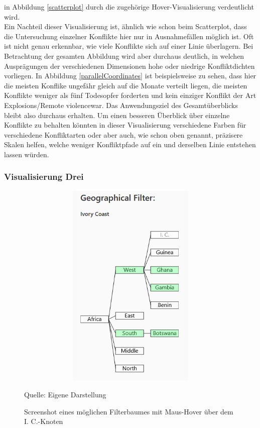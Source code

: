 \documentclass[usegeometry=true]{scrartcl}
\begin{document}
in Abbildung \ref{scatterplot} durch die zugehörige Hover-Visualisierung verdeutlicht wird.\\ Ein Nachteil dieser Visualisierung ist, ähnlich wie schon beim Scatterplot, dass die Untersuchung einzelner Konflikte hier nur in Ausnahmefällen möglich ist. Oft ist nicht genau erkennbar, wie viele Konflikte sich auf einer Linie überlagern. Bei Betrachtung der gesamten Abbildung wird aber durchaus deutlich, in welchen Ausprägungen der verschiedenen Dimensionen hohe oder niedrige Konfliktdichten vorliegen. In Abbildung \ref{parallelCoordinates} ist beispielsweise zu sehen, dass hier die meisten Konflike ungefähr gleich auf die Monate verteilt liegen, die meisten Konflikte weniger als fünf Todesopfer forderten und kein einziger Konflikt der Art \glqq Explosions/Remote violence\grqq war. Das Anwendungsziel des Gesamtüberblicks bleibt also durchaus erhalten. Um einen besseren Überblick über einzelne Konflikte zu behalten könnten in dieser Visualisierung verschiedene Farben für verschiedene Konfliktarten oder aber auch, wie schon oben genannt, präzisere Skalen helfen, welche weniger Konfliktpfade auf ein und derselben Linie entstehen lassen würden.\\

\subsubsection{Visualisierung Drei}

\begin{figure}[]
\begin{center}
\includegraphics[width=12cm,height=10cm,keepaspectratio]{FilterTree.PNG}%
\caption{Screenshot eines möglichen Filterbaumes mit Maus-Hover über dem \glqq I. C.\grqq-Knoten}
Quelle: Eigene Darstellung
\label{filtertree}
\end{center}
\end{figure}
\end{document}
